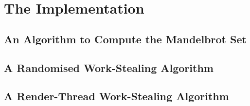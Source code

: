 \section{The Implementation}

\subsection{An Algorithm to Compute the Mandelbrot Set}


\subsection{A Randomised Work-Stealing Algorithm}


\subsection{A Render-Thread Work-Stealing Algorithm}


